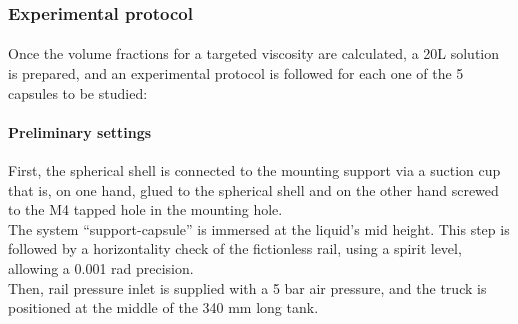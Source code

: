 \subsubsection{Experimental protocol}
\paragraph{}
Once the volume fractions for a targeted viscosity are calculated, a 20L solution is prepared, and an experimental protocol is followed for each one of the 5 capsules to be studied:
\paragraph{Preliminary settings}
First, the spherical shell is connected to the mounting support via a suction cup that is, on one hand, glued to the spherical shell and on the other hand screwed to the M4 tapped hole in the mounting hole.\\
The system "`support-capsule"' is immersed at the liquid's mid height. This step is followed by a horizontality check of the fictionless rail, using a spirit level, allowing a 0.001 rad precision.\\
Then, rail pressure inlet is supplied with a 5 bar air pressure, and the truck is positioned at the middle of the 340 mm long tank.\\
